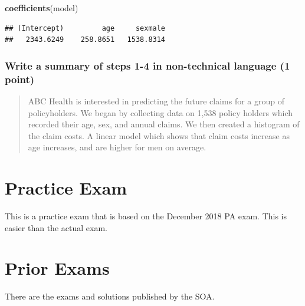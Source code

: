 \documentclass[]{book}
\newenvironment{Shaded}{\begin{snugshade}}{\end{snugshade}}
\newcommand{\KeywordTok}[1]{\textcolor[rgb]{0.13,0.29,0.53}{\textbf{#1}}}
\newcommand{\NormalTok}[1]{#1}
\begin{document}
\begin{Shaded}
\begin{Highlighting}[]
\KeywordTok{coefficients}\NormalTok{(model)}
\end{Highlighting}
\end{Shaded}

\begin{verbatim}
## (Intercept)         age     sexmale 
##   2343.6249    258.8651   1538.8314
\end{verbatim}

\hypertarget{write-a-summary-of-steps-1-4-in-non-technical-language-1-point}{%
\subsection{Write a summary of steps 1-4 in non-technical language (1 point)}\label{write-a-summary-of-steps-1-4-in-non-technical-language-1-point}}

\begin{quote}
ABC Health is interested in predicting the future claims for a group of policyholders. We began by collecting data on 1,538 policy holders which recorded their age, sex, and annual claims. We then created a histogram of the claim costs. A linear model which shows that claim costs increase as age increases, and are higher for men on average.
\end{quote}

\hypertarget{practice-exam}{%
\chapter{Practice Exam}\label{practice-exam}}

This is a practice exam that is based on the December 2018 PA exam. This is easier than the actual exam.

\hypertarget{prior-exams}{%
\chapter{Prior Exams}\label{prior-exams}}

There are the exams and solutions published by the SOA.


\end{document}
